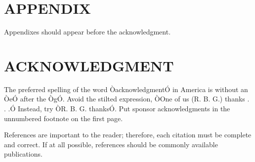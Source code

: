 \documentclass[letterpaper, 10 pt, conference]{ieeeconf}  %
\begin{document}






\section*{APPENDIX}

Appendixes should appear before the acknowledgment.

\section*{ACKNOWLEDGMENT}

The preferred spelling of the word ÒacknowledgmentÓ in America is without an ÒeÓ after the ÒgÓ. Avoid the stilted expression, ÒOne of us (R. B. G.) thanks . . .Ó  Instead, try ÒR. B. G. thanksÓ. Put sponsor acknowledgments in the unnumbered footnote on the first page.




References are important to the reader; therefore, each citation must be complete and correct. If at all possible, references should be commonly available publications.





\end{document}
